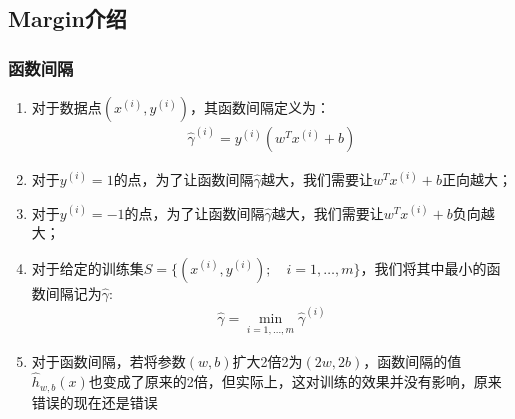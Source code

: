 \subsection{Margin介绍}
\subsubsection{函数间隔}
\begin{enumerate}
	\item 对于数据点$(x^{(i)}, y^{(i)})$，其函数间隔定义为：
	\begin{align}
		\hat{\gamma}^{(i)} = y^{(i)}(w^Tx^{(i)} + b)
	\end{align}
	\item 对于$y^{(i)}=1$的点，为了让函数间隔$\hat{\gamma}$越大，我们需要让$w^Tx^{(i)} + b$正向越大；
	\item 对于$y^{(i)}=-1$的点，为了让函数间隔$\hat{\gamma}$越大，我们需要让$w^Tx^{(i)} + b$负向越大；
	\item 对于给定的训练集$S=\{(x^{(i)}, y^{(i)}); \quad i = 1, \dots, m\}$，我们将其中最小的函数间隔记为$\hat{\gamma}$:
	\begin{align}
		\hat{\gamma} = \min_{i=1,\dots,m}\hat{\gamma}^{(i)}
	\end{align}
	\item 对于函数间隔，若将参数$(w,b)$扩大2倍2为$(2w,2b)$，函数间隔的值$\hat{h}_{w,b}(x)$也变成了原来的2倍，但实际上，这对训练的效果并没有影响，原来错误的现在还是错误
\end{enumerate}

